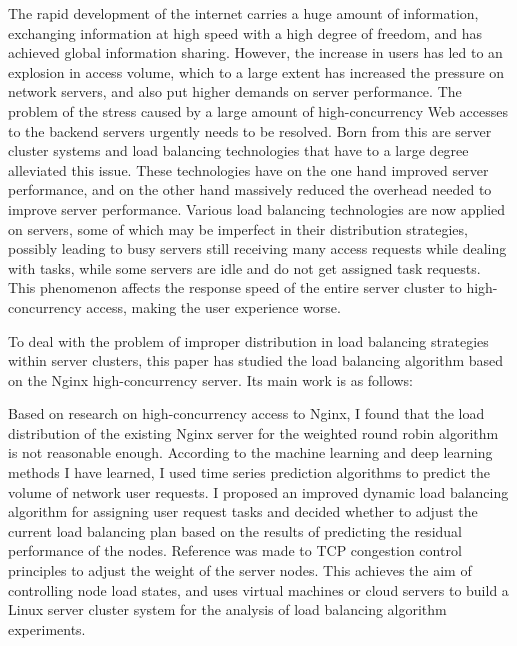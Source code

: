 \begin{eabstract} 

The rapid development of the internet carries a huge amount of information, 
exchanging information at high speed with a high degree of freedom, and has achieved global information sharing.
However, the increase in users has led to an explosion in access volume, 
which to a large extent has increased the pressure on network servers, and also put higher demands on server performance.
The problem of the stress caused by a large amount of high-concurrency Web accesses to the backend servers urgently needs to be resolved. 
Born from this are server cluster systems and load balancing technologies that have to a large degree alleviated this issue. 
These technologies have on the one hand improved server performance, and on the other hand massively reduced the overhead needed to improve server performance. 
Various load balancing technologies are now applied on servers, some of which may be imperfect in their distribution strategies, 
possibly leading to busy servers still receiving many access requests while dealing with tasks, 
while some servers are idle and do not get assigned task requests. 
This phenomenon affects the response speed of the entire server cluster to high-concurrency access, 
making the user experience worse.

To deal with the problem of improper distribution in load balancing strategies within server clusters, 
this paper has studied the load balancing algorithm based on the Nginx high-concurrency server.
Its main work is as follows:

Based on research on high-concurrency access to Nginx,
I found that the load distribution of the existing Nginx server for the weighted round robin algorithm is not reasonable enough.
According to the machine learning and deep learning methods I have learned, 
I used time series prediction algorithms to predict the volume of network user requests.
I proposed an improved dynamic load balancing algorithm for assigning user request tasks and decided whether to adjust the current load balancing plan based on the results of predicting the residual performance of the nodes.
Reference was made to TCP congestion control principles to adjust the weight of the server nodes.
This achieves the aim of controlling node load states,
and uses virtual machines or cloud servers to build a Linux server cluster system for the analysis of load balancing algorithm experiments.

\end{eabstract}

